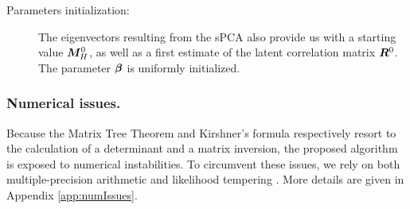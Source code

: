 \begin{description}
\item[Parameters initialization:]
The eigenvectors resulting from the sPCA also provide us with a starting value ${\boldsymbol{M}}^0_H$, as well as a first estimate of the latent correlation matrix ${\boldsymbol{R}}^0$. The parameter ${\boldsymbol{\beta}}$ is uniformly initialized.
\end{description}
 
\subsubsection*{Numerical issues.}

Because the Matrix Tree Theorem and Kirshner's formula respectively resort to the calculation of a determinant and a matrix inversion, the proposed algorithm is exposed to numerical instabilities. To circumvent these issues, we rely on both multiple-precision arithmetic and likelihood tempering \citep[via a parameter $\alpha$, similarly to][]{ScR17}. More details are given in Appendix \ref{app:numIssues}.

 
